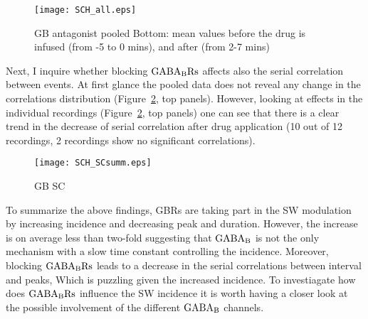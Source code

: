     \begin{figure}
      \texttt{[image: SCH\_all.eps]}
      \caption{GB antagonist pooled
              Bottom: mean values before the drug is infused (from -5 to 0 mins), and after (from 2-7 mins)
            }
    \label{gB_summ}
    \end{figure}

    Next, I inquire whether blocking $\rm GABA_B Rs$ affects also the serial
    correlation between events. At first glance the pooled data does not reveal
    any change in the correlations distribution (Figure~\ref{gB_SCsumm}, top
    panels).  However, looking at effects in the individual recordings
    (Figure~\ref{gB_SCsumm}, top panels) one can see that there is a clear
    trend in the decrease of serial correlation after drug application (10 out
    of 12 recordings, 2 recordings show no significant correlations).

    \begin{figure}
      \texttt{[image: SCH\_SCsumm.eps]}
      \caption{GB SC
            }
    \label{gB_SCsumm}
    \end{figure}

    To summarize the above findings, GBRs are taking part in the SW modulation
    by increasing incidence and decreasing peak and duration. However, the
    increase is on average less than two-fold suggesting that $\rm GABA_B$ is
    not the only mechanism with a slow time constant controlling the incidence.
    Moreover, blocking $\rm GABA_B Rs$ leads to a decrease in the serial
    correlations between interval and peaks, Which is puzzling given the
    increased incidence.  To investiagate how does $\rm GABA_B Rs$ influence
    the SW incidence it is worth having a closer look at the possible
    involvement of the different $\rm GABA_B$ channels.

